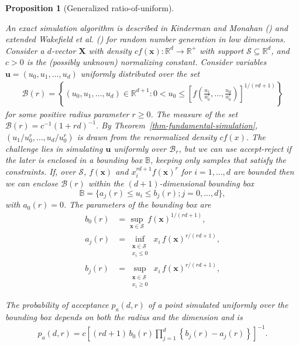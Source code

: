 \documentclass[
  11pt,
  letterpaper,
]{scrbook}
\theoremstyle{definition}
\theoremstyle{plain}
\newtheorem{proposition}{Proposition}[chapter]
\theoremstyle{plain}
\theoremstyle{plain}
\theoremstyle{definition}
\theoremstyle{definition}
\theoremstyle{plain}
\newtheorem{proposition}{Proposition}[chapter]
\theoremstyle{plain}
\theoremstyle{remark}
\begin{document}
\begin{proposition}[Generalized
ratio-of-uniform]\protect\hypertarget{prp-ratio-uniform}{}\label{prp-ratio-uniform}

An exact simulation algorithm is described in Kinderman and Monahan
() and extended Wakefield et
al. () for random
number generation in low dimensions. Consider a \(d\)-vector
\(\boldsymbol{X}\) with density
\(cf(\boldsymbol{x}): \mathbb{R}^d \to \mathbb{R}^{+}\) with support
\(\mathcal{S} \subseteq \mathbb{R}^d\), and \(c>0\) is the (possibly
unknown) normalizing constant. Consider variables
\(\boldsymbol{u} = (u_0, u_1, \ldots, u_d)\) uniformly distributed over
the set \begin{align*}
\mathcal{B}(r) = \left\{ (u_0, u_1, \ldots, u_d) \in \mathbb{R}^{d+1}: 0 < u_0 \leq \left[ f\left( \frac{u_1}{u_0^r}, \ldots, \frac{u_d}{u_0^r} \right) \right] ^ {1/(r d + 1)} \right\}
\end{align*} for some positive radius parameter \(r \geq 0\). The
measure of the set \(\mathcal{B}(r)=c^{-1}(1+rd)^{-1}.\) By
Theorem~\ref{thm-fundamental-simulation},
\((u_1 / u_0^r, \ldots, u_d / u_0^r)\) is drawn from the renormalized
density \(cf(x)\). The challenge lies in simulating \(\boldsymbol{u}\)
uniformly over \(\mathcal{B}_r\), but we can use accept-reject if the
later is enclosed in a bounding box \(\mathbb{B}\), keeping only samples
that satisfy the constraints. If, over \(\mathcal{S}\),
\(f(\boldsymbol{x})\) and \(x_i^{r d +1} f(\boldsymbol{x})^r\) for
\(i = 1, \ldots, d\) are bounded then we can enclose \(\mathcal{B}(r)\)
within the \((d+1)\)-dimensional bounding box
\[\mathbb{B}=\{a_j(r) \leq u_i \leq b_j(r);  j = 0, \ldots, d \},\] with
\(a_0(r)=0\). The parameters of the bounding box are\\
\begin{align*}
b_0(r) &= \sup_{\boldsymbol{x} \in \mathcal{S}} \, f(\boldsymbol{x})^{1 / (r d + 1)}, \\
a_j(r) &= \inf_{\substack{\boldsymbol{x} \in \mathcal{S}\\ x_i \leq 0}} \, x_i \, f(\boldsymbol{x})^{r / (r d + 1)}, \\  
b_j(r) &= \sup_{{\substack{\boldsymbol{x} \in \mathcal{S}\\ x_i \geq 0}}} \, x_i \, f(\boldsymbol{x})^{r / (r d + 1)},  
\end{align*}

The probability of acceptance \(p_a(d, r)\) of a point simulated
uniformly over the bounding box depends on both the radius and the
dimension and is \begin{align*}
p_a(d, r) = c\left[(r d + 1) \, b_0(r) \displaystyle\prod_{j=1}^d \left\{b_j(r) -a_j(r) \right\}\right]^{-1}.
\end{align*}


\end{proposition}
\end{document}
